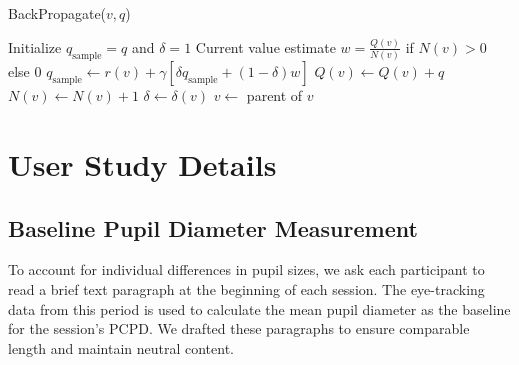 \begin{minipage}{\textwidth}
    \centering
    \begin{algorithm}[H]
        \captionsetup{labelformat=default,labelsep=colon,name=Procedure}
        \caption{\sc BackPropagate($v, q$)}
        \label{algo:backprop}
        \begin{algorithmic}[1]
            \STATE Initialize $q_{\text{sample}} = q$ and $\delta=1$
                \STATE Current value estimate $w = \frac{Q(v)}{N(v)}$ if $N(v)>0$ else $0$
                \STATE $q_{\text{sample}} \gets r(v) + \gamma\left[\delta q_{\text{sample}} + (1-\delta) w\right]$
                \STATE $Q(v) \gets Q(v) + q$
                \STATE $N(v) \gets N(v) + 1$
                \STATE $\delta\gets \delta(v)$
                \STATE $v \gets$ parent of $v$
            \ENDWHILE
        \end{algorithmic}
    \end{algorithm}
\end{minipage}


\newpage
\section{User Study Details}
\subsection{Baseline Pupil Diameter Measurement}\label{appendix:baseline_pupil}
To account for individual differences in pupil sizes, we ask each participant to read a brief text paragraph at the beginning of each session. The eye-tracking data from this period is used to calculate the mean pupil diameter as the baseline for the session's PCPD. We drafted these paragraphs to ensure comparable length and maintain neutral content.

